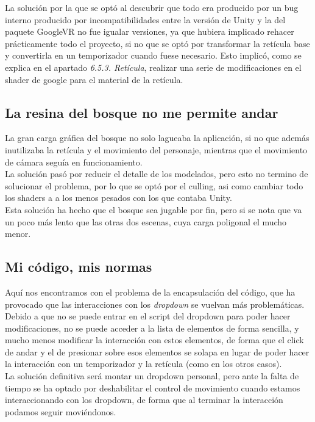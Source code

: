 \quad La solución por la que se optó al descubrir que todo era producido por un bug interno producido por incompatibilidades entre la versión de Unity y la del paquete GoogleVR no fue igualar versiones, ya que hubiera implicado rehacer prácticamente todo el proyecto, si no que se optó por transformar la retícula base y convertirla en un temporizador cuando fuese necesario. Esto implicó, como se explica en el apartado \textit{6.5.3. Retícula}, realizar una serie de modificaciones en el shader de google para el material de la retícula.\\

\subsection{La resina del bosque no me permite andar}

\quad La gran carga gráfica del bosque no solo lagueaba la aplicación, si no que además inutilizaba la retícula y el movimiento del personaje, mientras que el movimiento de cámara seguía en funcionamiento.\\

\quad La solución pasó por reducir el detalle de los modelados, pero esto no termino de solucionar el problema, por lo que se optó por el culling, asi como cambiar todo los shaders a a los menos pesados con los que contaba Unity.\\

\quad Esta solución ha hecho que el bosque sea jugable por fin, pero si se nota que va un poco más lento que las otras dos escenas, cuya carga poligonal el mucho menor.\\

\subsection{Mi código, mis normas}\label{7.4}

\quad Aquí nos encontramos con el problema de la encapsulación del código, que ha provocado que las interacciones con los \textit{dropdown} se vuelvan más problemáticas.\\

\quad Debido a que no se puede entrar en el script del dropdown para poder hacer modificaciones, no se puede acceder a la lista de elementos de forma sencilla, y mucho menos modificar la interacción con estos elementos, de forma que el click de andar y el de presionar sobre esos elementos se solapa en lugar de poder hacer la interacción con un temporizador y la retícula (como en los otros casos).\\

\quad La solución definitiva será montar un dropdown personal, pero ante la falta de tiempo se ha optado por deshabilitar el control de movimiento cuando estamos interaccionando con los dropdown, de forma que al terminar la interacción podamos seguir moviéndonos.\\

\newpage





